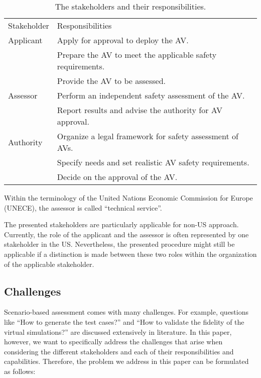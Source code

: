 \begin{table}
	\centering
	\caption{The stakeholders and their responsibilities.}
	\label{tab:stakeholders}
	\begin{tabularx}{\linewidth}{lX}
		\toprule
		Stakeholder & Responsibilities \\ \otoprule
		Applicant & Apply for approval to deploy the AV. \\
		& Prepare the AV to meet the applicable safety requirements. \\
		& Provide the AV to be assessed. \\ \otoprule
		Assessor & Perform an independent safety assessment of the AV. \\
		& Report results and advise the authority for AV approval. \\ \otoprule
		Authority & Organize a legal framework for safety assessment of AVs. \\
		& Specify needs and set realistic AV safety requirements. \\
		& Decide on the approval of the AV. \\
		\bottomrule
	\end{tabularx}
\end{table}

\begin{remark}
	Within the terminology of the United Nations Economic Commission for Europe (UNECE), the assessor is called ``technical service''.
\end{remark}

\begin{remark}
	The presented stakeholders are particularly applicable for non-US approach. Currently, the role of the applicant and the assessor is often represented by one stakeholder in the US. Nevertheless, the presented procedure might still be applicable if a distinction is made between these two roles within the organization of the applicable stakeholder.
\end{remark}



\subsection{Challenges}
\label{sec:challenges}

Scenario-based assessment comes with many challenges. For example, questions like ``How to generate the test cases?'' and ``How to validate the fidelity of the virtual simulations?'' are discussed extensively in literature. In this paper, however, we want to specifically address the challenges that arise when considering the different stakeholders and each of their responsibilities and capabilities. Therefore, the problem we address in this paper can be formulated as follows:

